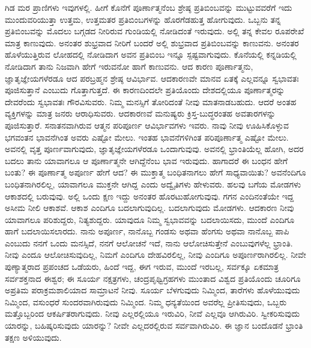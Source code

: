 ಗಿಡ ಮರ ಪ್ರಾಣಿಗಳು ಇವುಗಳಲ್ಲಿ. ಹೀಗೆ ಕೊನೆಗೆ ಪೂರ್ಣಾತ್ಮನೆಂಬ ಶ್ರೇಷ್ಠ ಪ್ರತಿಬಿಂಬವನ್ನು ಮುಟ್ಟುವವರೆಗೆ ಇದು ಮುಂದುವರಿಯುತ್ತಾ ಉತ್ತಮ, ಉತ್ತಮತರ ಪ್ರತಿಬಿಂಬಗಳನ್ನು ಹೊರಗೆಡಹುತ್ತ ಹೋಗುವುದು. ಒಬ್ಬನು ತನ್ನ ಪ್ರತಿಬಿಂಬವನ್ನು ಮೊದಲು ಬಗ್ಗಡದ ನೀರಿರುವ ಗುಂಡಿಯಲ್ಲಿ ನೋಡಿದಂತೆ ಇರುವುದು. ಅಲ್ಲಿ ತನ್ನ ಕೇವಲ ರೂಪರೇಖೆ ಮಾತ್ರ ಕಾಣುವುದು. ಅನಂತರ ಶುಭ್ರವಾದ ನೀರಿಗೆ ಬಂದರೆ ಅಲ್ಲಿ ಶುಭ್ರವಾದ ಪ್ರತಿಬಿಂಬವನ್ನು ಕಾಣುವನು. ಅನಂತರ ಹೊಳೆಯುತ್ತಿರುವ ಲೋಹದಲ್ಲಿ ನೋಡಿದಾಗ ಅವನ ಪ್ರತಿಬಿಂಬ ಇನ್ನೂ ಸ್ಪಷ್ಟವಾಗುವುದು. ಕೊನೆಯಲ್ಲಿ ಕನ್ನಡಿಯಲ್ಲಿ ನೋಡಿದಾಗ ತಾನು ನಿಜವಾಗಿ ಹೇಗೆ ಇರುವನೋ ಹಾಗೆ ಕಾಣುವನು. ಆದ ಕಾರಣ ಪೂರ್ಣಾತ್ಮನು, ಜ್ಞಾತೃಜ್ಞೇಯಗಳೆರಡೂ ಆದ ಪರಬ್ರಹ್ಮನ ಶ್ರೇಷ್ಠ ಆವಿರ್ಭಾವ. ಆದಕಾರಣವೇ ಮಾನವ ಏತಕ್ಕೆ ಎಲ್ಲವನ್ನೂ ಸ್ವಭಾವತಃ ಪೂಜಿಸುತ್ತಾನೆ ಎಂಬುದು ಗೊತ್ತಾಗುತ್ತದೆ. ಈ ಕಾರಣದಿಂದಲೇ ಪ್ರತಿಯೊಂದು ದೇಶದಲ್ಲಿಯೂ ಪೂರ್ಣಾತ್ಮರನ್ನು ದೇವರೆಂದು ಸ್ವಭಾವತಃ ಗೌರವಿಸುವರು. ನಿಮ್ಮ ಮನಸ್ಸಿಗೆ ತೋರಿದಂತೆ ನೀವು ಮಾತನಾಡಬಹುದು. ಆದರೆ ಅಂತಹ ವ್ಯಕ್ತಿಗಳನ್ನು ಮಾತ್ರ ಜನರು ಆರಾಧಿಸುವರು. ಆದಕಾರಣವೆ ಮನುಷ್ಯರು ಕ್ರಿಸ್ತ-ಬುದ್ಧರಂತಹ ಅವತಾರಗಳನ್ನು ಪೂಜಿಸುತ್ತಾರೆ. ಸನಾತನವಾಗಿರುವ ಆತ್ಮನ ಪರಿಪೂರ್ಣ ಆವಿರ್ಭಾವಗಳು ಇವರು. ನಾವು ನೀವು ಊಹಿಸಿಕೊಳ್ಳುವ ಭಗವಂತನ ಭಾವನೆಗಿಂತ ಅವರು ಎಷ್ಟೋ ಮೇಲು. ಇಂತಹ ಭಾವನೆಗಳಿಗಿಂತ ಪರಿಪೂರ್ಣಾತ್ಮ ಎಷ್ಟೋ ಮೇಲು. ಅವನಲ್ಲಿ ವೃತ್ತ ಪೂರ್ಣವಾಗುವುದು, ಜ್ಞಾತೃಜ್ಞೇಯಗಳೆರಡೂ ಒಂದಾಗುವುವು. ಅವನಲ್ಲಿ ಭ್ರಾಂತಿಯೆಲ್ಲ ಹೋಗಿ, ಅದರ ಬದಲು ತಾನು ಯಾವಾಗಲೂ ಆ ಪೂರ್ಣಾತ್ಮನೇ ಆಗಿದ್ದೆನೆಂಬ ಭಾವ ಇರುವುದು. ಹಾಗಾದರೆ ಈ ಬಂಧನ ಹೇಗೆ ಬಂತು? ಈ ಪೂರ್ಣಾತ್ಮ ಅಪೂರ್ಣ ಹೇಗೆ ಆದ? ಈ ಮುಕ್ತಾತ್ಮ ಬಂಧಿತನಾಗಲು ಹೇಗೆ ಸಾಧ್ಯವಾಯಿತು? ಅವನೆಂದಿಗೂ ಬಂಧಿತನಾಗಿರಲಿಲ್ಲ, ಯಾವಾಗಲೂ ಮುಕ್ತನೇ ಆಗಿದ್ದ ಎಂದು ಅದ್ವೈತಿಗಳು ಹೇಳುವರು. ಹಲವು ಬಗೆಯ ಮೋಡಗಳು ಆಕಾಶದಲ್ಲಿ ಬರುವುವು. ಅಲ್ಲಿ ಒಂದು ಕ್ಷಣ ಇದ್ದು ಅನಂತರ ಹೊರಟುಹೋಗುವುವು. ಗಗನ ಎಂದಿನಂತೆಯೇ ಇದ್ದ ಅಸೀಮ ನೀಲಿ ಆಕಾಶವೆ. ಆಕಾಶ ಎಂದಿಗೂ ಬದಲಾಗುವುದಿಲ್ಲ. ಬದಲಾಗುವುದು ಮೋಡಗಳು. ಆದಕಾರಣ ನೀವು ಯಾವಾಗಲೂ ಪರಿಶುದ್ದರು, ನಿತ್ಯಶುದ್ದರು. ಯಾವುದೂ ನಿಮ್ಮ ಸ್ವಭಾವವನ್ನು ಬದಲಾಯಿಸದು, ಮುಂದೆ ಎಂದಿಗೂ ಹಾಗೆ ಬದಲಾಯಿಸಲಾರದು. ನಾನು ಅಪೂರ್ಣ, ನಾನೊಬ್ಬ ಗಂಡಸು ಅಥವಾ ಹೆಂಗಸು ಅಥವಾ ನಾನೊಬ್ಬ ಪಾಪಿ ಎಂಬುದು ನನಗೆ ಒಂದು ಮನಸ್ಸಿದೆ, ನನಗೆ ಆಲೋಚನೆ ಇದೆ, ನಾನು ಆಲೋಚಿಸುತ್ತೇನೆ ಎಂಬುವುಗಳೆಲ್ಲ ಭ್ರಾಂತಿ. ನೀವು ಎಂದೂ ಆಲೋಚಿಸುವುದಿಲ್ಲ, ನಿಮಗೆ ಎಂದಿಗೂ ದೇಹವಿರಲಿಲ್ಲ, ನೀವು ಎಂದಿಗೂ ಅಪೂರ್ಣರಾಗಿರಲಿಲ್ಲ. ನೀವೇ ಪುಣ್ಯಾತ್ಮರಾದ ಪ್ರಪಂಚದ ಒಡೆಯರು, ಹಿಂದೆ ಇದ್ದ, ಈಗ ಇರುವ, ಮುಂದೆ ಇರಬಲ್ಲ, ಸರ್ವಕ್ಕೂ ಏಕಮಾತ್ರ ಸರ್ವಶಕ್ತನಾದ ಈಶ್ವರ; ಈ ಸೂರ್ಯ ನಕ್ಷತ್ರಗಳು, ಚಂದ್ರಪೃಥ್ವಿಗ್ರಹಗಳು ಮುಂತಾದ ವಿಶ್ವದ ಪ್ರತಿಯೊಂದು ಚೂರಿಗೂ ಅಪ್ರತಿಮ ಪರಾಕ್ರಮಶಾಲಿಯಾದ ಸಾಮ್ರಾಟನೆ ನೀವು. ಸೂರ್ಯ ಬೆಳಗುವುದು ನಿಮ್ಮಿಂದ, ತಾರೆಗಳು ಹೊಳೆಯುವುದು ನಿಮ್ಮಿಂದ, ವಸುಂಧರೆ ಸುಂದರವಾಗಿರುವುದು ನಿಮ್ಮಿಂದ. ನಿಮ್ಮ ಧನ್ಯತೆಯಿಂದ ಅವರೆಲ್ಲ ಪ್ರೀತಿಸುವುದು, ಒಬ್ಬರು ಮತ್ತೊಬ್ಬರಿಂದ ಆಕರ್ಷಿತರಾಗುವುದು. ನೀವು ಎಲ್ಲರಲ್ಲಿಯೂ ಇರುವಿರಿ, ನೀವೆ ಎಲ್ಲವೂ ಆಗಿರುವಿರಿ. ಸ್ವೀಕರಿಸುವುದು ಯಾರನ್ನು, ಬಹಿಷ್ಕರಿಸುವುದು ಯಾರನ್ನು? ನೀವೇ ಎಲ್ಲದರಲ್ಲಿರುವ ಸರ್ವವಾಗಿರುವಿರಿ. ಈ ಜ್ಞಾನ ಬಂದೊಡನೆ ಭ್ರಾಂತಿ ತಕ್ಷಣ ಅಳಿಯುವುದು.

